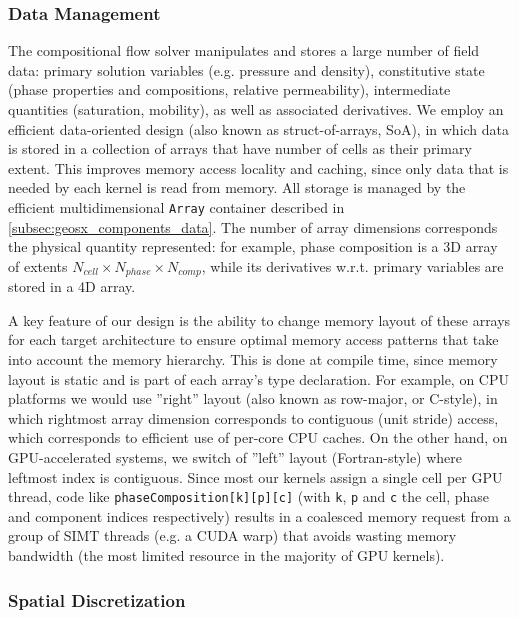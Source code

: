 \subsubsection{Data Management}

The compositional flow solver manipulates and stores a large number of field data: primary solution variables (e.g. pressure and density), constitutive state (phase properties and compositions, relative permeability), intermediate quantities (saturation, mobility), as well as associated derivatives.   We employ an efficient data-oriented design (also known as struct-of-arrays, SoA), in which data is stored in a collection of arrays that have number of cells as their primary extent.   This improves memory access locality and caching, since only data that is needed by each kernel is read from memory.   All storage is managed by the efficient multidimensional \texttt{Array} container described in \cref{subsec:geosx_components_data}.   The number of array dimensions corresponds the physical quantity represented: for example, phase composition is a 3D array of extents $N_{cell} \times N_{phase} \times N_{comp}$, while its derivatives w.r.t. primary variables are stored in a 4D array.

A key feature of our design is the ability to change memory layout of these arrays for each target architecture to ensure optimal memory access patterns that take into account the memory hierarchy.   This is done at compile time, since memory layout is static and is part of each array's type declaration.   For example, on CPU platforms we would use ''right'' layout (also known as row-major, or C-style), in which rightmost array dimension corresponds to contiguous (unit stride) access, which corresponds to efficient use of per-core CPU caches.   On the other hand, on GPU-accelerated systems, we switch of ''left'' layout (Fortran-style) where leftmost index is contiguous.   Since most our kernels assign a single cell per GPU thread, code like \texttt{phaseComposition[k][p][c]} (with \texttt{k}, \texttt{p} and \texttt{c} the cell, phase and component indices respectively) results in a coalesced memory request from a group of SIMT threads (e.g. a CUDA warp) that avoids wasting memory bandwidth (the most limited resource in the majority of GPU kernels).

\subsubsection{Spatial Discretization}

